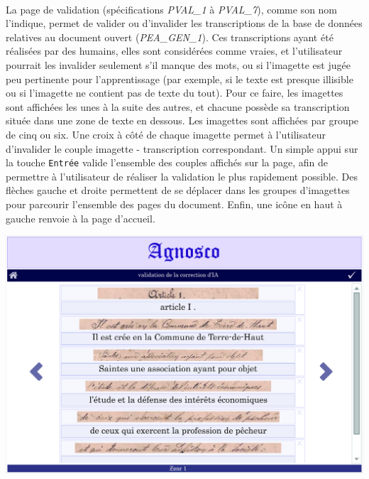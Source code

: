 \paragraph{}
La page de validation (spécifications \textit{PVAL\_1} à \textit{PVAL\_7}), comme son nom l’indique, permet de valider ou d’invalider les transcriptions de la base de données relatives au document ouvert (\textit{PEA\_GEN\_1}). Ces transcriptions ayant été réalisées par des humains, elles sont considérées comme vraies, et l’utilisateur pourrait les invalider seulement s’il manque des mots, ou si l’imagette est jugée peu pertinente pour l’apprentissage (par exemple, si le texte est presque illisible ou si l’imagette ne contient pas de texte du tout).
\newline{}
Pour ce faire, les imagettes sont affichées les unes à la suite des autres, et chacune possède sa transcription située dans une zone de texte en dessous. Les imagettes sont affichées par groupe de cinq ou six. Une croix à côté de chaque imagette permet à l’utilisateur d’invalider le couple imagette - transcription correspondant. Un simple appui sur la touche \texttt{Entrée} valide l’ensemble des couples affichés sur la page, afin de permettre à l’utilisateur de réaliser la validation le plus rapidement possible. Des flèches gauche et droite permettent de se déplacer dans les groupes d’imagettes pour parcourir l’ensemble des pages du document. Enfin, une icône en haut à gauche renvoie à la page d’accueil.

\begin{mdframed}[frametitle={Figure 2 : Maquette de la page de validation des annotations}, innerbottommargin=10]
\begin{center}
\includegraphics[scale=0.04]{assets/maquetteIHMvalidation1.jpg}
\end{center}
\end{mdframed}

